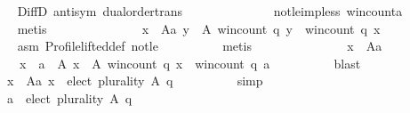 \begin{isabellebody}
\ \ \ \ \ \ \ \ \isamarkupfalse%
\ DiffD{}\ antisym\ dual{\isacharunderscore}{\kern0pt}order{\isachardot}{\kern0pt}trans\isanewline
\ \ \ \ \ \ \ \ \ \ \ \ \ \ not{\isacharunderscore}{\kern0pt}le{\isacharunderscore}{\kern0pt}imp{\isacharunderscore}{\kern0pt}less\ win{\isacharunderscore}{\kern0pt}count{\isacharunderscore}{\kern0pt}a\isanewline
\ \ \ \ \ \ \ \ \isamarkupfalse%
\ metis\isanewline
\ \ \ \ \ \ \isamarkupfalse%
\isanewline
\ \ \ \ \ \ \ \ {\isachardoublequoteopen}{\isasymforall}x\ {\isasymin}\ A{\isacharminus}{\kern0pt}{\isacharbraceleft}{\kern0pt}a{\isacharbraceright}{\kern0pt}{\isachardot}{\kern0pt}\ {\isasymnot}{\isacharparenleft}{\kern0pt}{\isasymforall}y\ {\isasymin}\ A{\isachardot}{\kern0pt}\ win{\isacharunderscore}{\kern0pt}count\ q\ y\ {\isasymle}\ win{\isacharunderscore}{\kern0pt}count\ q\ x{\isacharparenright}{\kern0pt}{\isachardoublequoteclose}\isanewline
\ \ \ \ \ \ \ \ \isamarkupfalse%
\ asm{}\ Profile{\isachardot}{\kern0pt}lifted{\isacharunderscore}{\kern0pt}def\ not{\isacharunderscore}{\kern0pt}le\isanewline
\ \ \ \ \ \ \ \ \isamarkupfalse%
\ metis\isanewline
\ \ \ \ \ \ \isamarkupfalse%
\isanewline
\ \ \ \ \ \ \ \ {\isachardoublequoteopen}{\isasymforall}x\ {\isasymin}\ A{\isacharminus}{\kern0pt}{\isacharbraceleft}{\kern0pt}a{\isacharbraceright}{\kern0pt}{\isachardot}{\kern0pt}\isanewline
\ \ \ \ \ \ \ \ \ \ x\ {\isasymnotin}\ {\isacharbraceleft}{\kern0pt}a\ {\isasymin}\ A{\isachardot}{\kern0pt}\ {\isasymforall}x\ {\isasymin}\ A{\isachardot}{\kern0pt}\ win{\isacharunderscore}{\kern0pt}count\ q\ x\ {\isasymle}\ win{\isacharunderscore}{\kern0pt}count\ q\ a{\isacharbraceright}{\kern0pt}{\isachardoublequoteclose}\isanewline
\ \ \ \ \ \ \ \ \isamarkupfalse%
\ blast\isanewline
\ \ \ \ \ \ \isamarkupfalse%
\isanewline
\ \ \ \ \ \ \ \ {\isachardoublequoteopen}{\isasymforall}x\ {\isasymin}\ A{\isacharminus}{\kern0pt}{\isacharbraceleft}{\kern0pt}a{\isacharbraceright}{\kern0pt}{\isachardot}{\kern0pt}\ x\ {\isasymnotin}\ elect\ plurality\ A\ q{\isachardoublequoteclose}\isanewline
\ \ \ \ \ \ \ \ \isamarkupfalse%
\ simp\isanewline
\ \ \ \ \ \ \isamarkupfalse%
\ \isamarkupfalse%
\isanewline
\ \ \ \ \ \ \ \ {\isachardoublequoteopen}a\ {\isasymin}\ elect\ plurality\ A\ q{\isachardoublequoteclose}\isanewline
\ \ \ \ \ \ \isamarkupfalse%
\ {\isacharminus}{\kern0pt}\isanewline
\ \ \ \ \ \ \ \ \isamarkupfalse%

\end{isabellebody}
